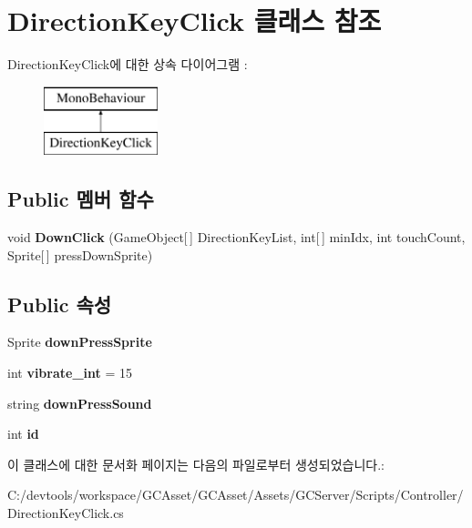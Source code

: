 \hypertarget{class_direction_key_click}{}\section{Direction\+Key\+Click 클래스 참조}
\label{class_direction_key_click}
Direction\+Key\+Click에 대한 상속 다이어그램 \+: \begin{figure}[H]
\begin{center}
\leavevmode
\includegraphics[height=2.000000cm]{class_direction_key_click}
\end{center}
\end{figure}
\subsection*{Public 멤버 함수}
\begin{DoxyCompactItemize}
\item 
\hypertarget{class_direction_key_click_a2a2ac6478aefec9bbb794e61fe548e2d}{}void {\bfseries Down\+Click} (Game\+Object\mbox{[}$\,$\mbox{]} Direction\+Key\+List, int\mbox{[}$\,$\mbox{]} min\+Idx, int touch\+Count, Sprite\mbox{[}$\,$\mbox{]} press\+Down\+Sprite)\label{class_direction_key_click_a2a2ac6478aefec9bbb794e61fe548e2d}

\end{DoxyCompactItemize}
\subsection*{Public 속성}
\begin{DoxyCompactItemize}
\item 
\hypertarget{class_direction_key_click_a787c7dfe720ee86d820011371bc83e2f}{}Sprite {\bfseries down\+Press\+Sprite}\label{class_direction_key_click_a787c7dfe720ee86d820011371bc83e2f}

\item 
\hypertarget{class_direction_key_click_ade1220b81a0de4ca8a8d61bca87deb74}{}int {\bfseries vibrate\+\_\+int} = 15\label{class_direction_key_click_ade1220b81a0de4ca8a8d61bca87deb74}

\item 
\hypertarget{class_direction_key_click_a404f6b7b957ce75421ebcbf93bbc60b2}{}string {\bfseries down\+Press\+Sound}\label{class_direction_key_click_a404f6b7b957ce75421ebcbf93bbc60b2}

\item 
\hypertarget{class_direction_key_click_a3924c20fb7c7f1e60908e992cebf9248}{}int {\bfseries id}\label{class_direction_key_click_a3924c20fb7c7f1e60908e992cebf9248}

\end{DoxyCompactItemize}


이 클래스에 대한 문서화 페이지는 다음의 파일로부터 생성되었습니다.\+:\begin{DoxyCompactItemize}
\item 
C\+:/devtools/workspace/\+G\+C\+Asset/\+G\+C\+Asset/\+Assets/\+G\+C\+Server/\+Scripts/\+Controller/Direction\+Key\+Click.\+cs\end{DoxyCompactItemize}
